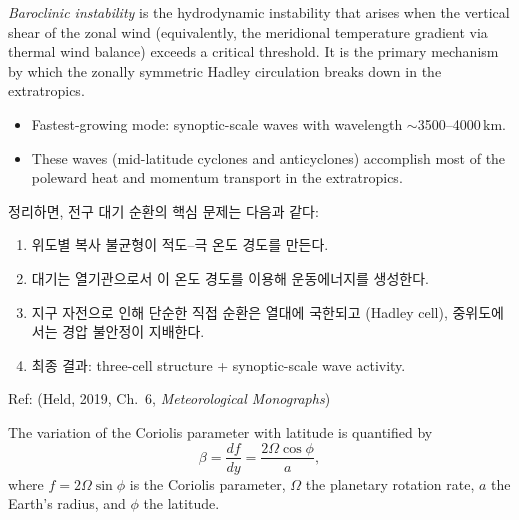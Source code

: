 \begin{definition}\label{def:baroclinic}

  \emph{Baroclinic instability} is the hydrodynamic instability that arises when
  the vertical shear of the zonal wind (equivalently, the meridional temperature
  gradient via thermal wind balance) exceeds a critical threshold.
  It is the primary mechanism by which the zonally symmetric Hadley circulation
  breaks down in the extratropics.
  \begin{itemize}
    \item Fastest-growing mode: synoptic-scale waves with wavelength
      $\sim$3500--4000\,km.
    \item These waves (mid-latitude cyclones and anticyclones) accomplish most of the
      poleward heat and momentum transport in the extratropics.
  \end{itemize}
\end{definition}

\begin{hisublock}
  정리하면, 전구 대기 순환의 핵심 문제는 다음과 같다:
  \begin{enumerate}
    \item 위도별 복사 불균형이 적도--극 온도 경도를 만든다.
    \item 대기는 열기관으로서 이 온도 경도를 이용해 운동에너지를 생성한다.
    \item 지구 자전으로 인해 단순한 직접 순환은 열대에 국한되고 (Hadley cell),
          중위도에서는 경압 불안정이 지배한다.
    \item 최종 결과: three-cell structure + synoptic-scale wave activity.
  \end{enumerate}
  Ref: (Held, 2019, Ch.~6, \textit{Meteorological Monographs})
\end{hisublock}

\begin{definition}\label{def:beta-effect}

  The variation of the Coriolis parameter with latitude is quantified by
  \begin{equation}\label{eq:beta}
    \beta = \frac{df}{dy} = \frac{2\Omega\cos\phi}{a},
  \end{equation}
  where $f = 2\Omega\sin\phi$ is the Coriolis parameter, $\Omega$ the planetary
  rotation rate, $a$ the Earth's radius, and $\phi$ the latitude.
\end{definition}

